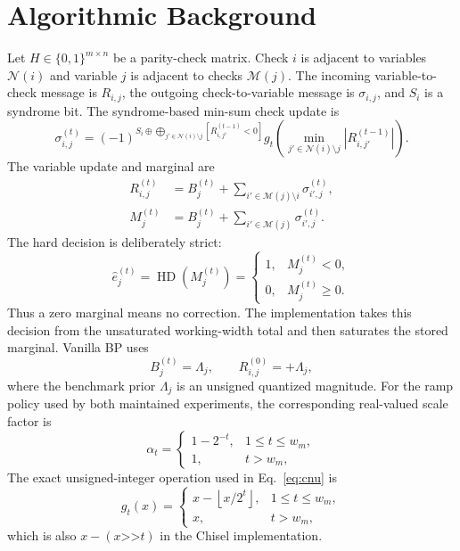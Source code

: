 \documentclass[10pt,conference]{IEEEtran}
\begin{document}
\section{Algorithmic Background}
Let $H\in\{0,1\}^{m\times n}$ be a parity-check matrix.  Check $i$ is adjacent
to variables $\mathcal{N}(i)$ and variable $j$ is adjacent to checks
$\mathcal{M}(j)$.  The incoming variable-to-check message is $R_{i,j}$, the
outgoing check-to-variable message is $\sigma_{i,j}$, and $S_i$ is a syndrome
bit.  The syndrome-based min-sum check update is
\begin{equation}
 \sigma_{i,j}^{(t)} =
 (-1)^{S_i\oplus
 \bigoplus_{j'\in\mathcal{N}(i)\setminus j}
 [R_{i,j'}^{(t-1)}<0]}
 g_t\!\left(
 \min_{j'\in\mathcal{N}(i)\setminus j}|R_{i,j'}^{(t-1)}|
 \right).
 \label{eq:cnu}
\end{equation}
The variable update and marginal are
\begin{align}
 R_{i,j}^{(t)} &= B_j^{(t)}+
 \sum_{i'\in\mathcal{M}(j)\setminus i}\sigma_{i',j}^{(t)},
 \label{eq:vnu}\\
 M_j^{(t)} &= B_j^{(t)}+
 \sum_{i'\in\mathcal{M}(j)}\sigma_{i',j}^{(t)}.
 \label{eq:marginal}
\end{align}
The hard decision is deliberately strict:
\begin{equation}
 \hat e_j^{(t)}=\operatorname{HD}(M_j^{(t)})=
 \begin{cases}
  1,&M_j^{(t)}<0,\\
  0,&M_j^{(t)}\geq 0.
 \end{cases}
 \label{eq:hard-decision}
\end{equation}
Thus a zero marginal means no correction.  The implementation takes this
decision from the unsaturated working-width total and then saturates the stored
marginal.  Vanilla BP uses
\begin{equation}
 B_j^{(t)}=\Lambda_j,
 \qquad
 R_{i,j}^{(0)}=+\Lambda_j,
 \label{eq:vanilla-bias}
\end{equation}
where the benchmark prior $\Lambda_j$ is an unsigned quantized magnitude.
For the ramp policy used by both maintained experiments, the corresponding
real-valued scale factor is
\begin{equation}
 \alpha_t=
 \begin{cases}
  1-2^{-t},&1\leq t\leq w_m,\\
  1,&t>w_m,
 \end{cases}
 \label{eq:ramp-alpha}
\end{equation}
The exact unsigned-integer operation used in Eq.~\eqref{eq:cnu} is
\begin{equation}
 g_t(x)=
 \begin{cases}
  x-\left\lfloor x/2^t\right\rfloor,&1\leq t\leq w_m,\\
  x,&t>w_m,
 \end{cases}
 \label{eq:ramp-integer}
\end{equation}
which is also $x-(x\mathbin{\texttt{>>}}t)$ in the Chisel implementation.
\end{document}
